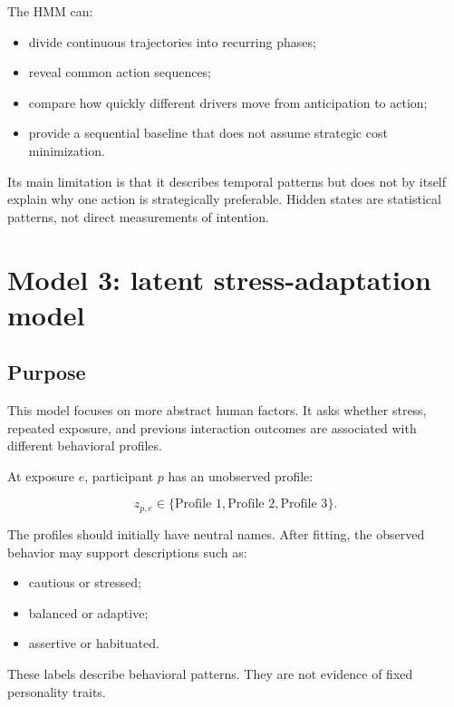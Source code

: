 \documentclass[11pt,a4paper]{article}
\begin{document}
The HMM can:

\begin{itemize}[noitemsep]
  \item divide continuous trajectories into recurring phases;
  \item reveal common action sequences;
  \item compare how quickly different drivers move from anticipation to action;
  \item provide a sequential baseline that does not assume strategic cost minimization.
\end{itemize}

Its main limitation is that it describes temporal patterns but does not by itself explain why one action is strategically preferable. Hidden states are statistical patterns, not direct measurements of intention.

\section{Model 3: latent stress-adaptation model}
\label{sec:latent}

\subsection{Purpose}

This model focuses on more abstract human factors. It asks whether stress, repeated exposure, and previous interaction outcomes are associated with different behavioral profiles.

At exposure $e$, participant $p$ has an unobserved profile:

\begin{equation}
z_{p,e}
\in
\{\text{Profile 1},\text{Profile 2},\text{Profile 3}\}.
\end{equation}

The profiles should initially have neutral names. After fitting, the observed behavior may support descriptions such as:

\begin{itemize}[noitemsep]
  \item cautious or stressed;
  \item balanced or adaptive;
  \item assertive or habituated.
\end{itemize}

These labels describe behavioral patterns. They are not evidence of fixed personality traits.
\end{document}
